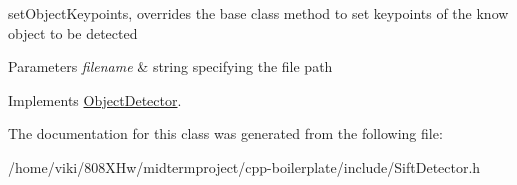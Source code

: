 set\+Object\+Keypoints, overrides the base class method to set keypoints of the know object to be detected 


\begin{DoxyParams}{Parameters}
{\em filename} & string specifying the file path \\
\hline
\end{DoxyParams}


Implements \hyperlink{class_object_detector_a0d91abdee4036427163e2fb9c1018cd8}{Object\+Detector}.



The documentation for this class was generated from the following file\+:\begin{DoxyCompactItemize}
\item 
/home/viki/808\+X\+Hw/midtermproject/cpp-\/boilerplate/include/Sift\+Detector.\+h\end{DoxyCompactItemize}
